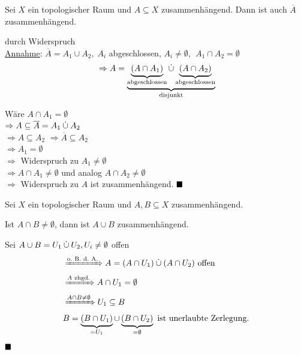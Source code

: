 \begin{bemerkung}\label{zusammenhangAbschluss}
    Sei $X$ ein topologischer Raum und $A \subseteq X$ zusammenhängend.
    Dann ist auch $\overline{A}$ zusammenhängend.
\end{bemerkung}

\begin{beweis} durch Widerspruch\\
    \underline{Annahme}: $\overline{A} = A_1 \cup A_2,\; A_i$ abgeschlossen, $A_i \neq \emptyset$,
    $\;A_1 \cap A_2 = \emptyset$
    \begin{align*}
        &\Rightarrow A = \underbrace{\underbrace{(A \cap A_1)}_\text{abgeschlossen} \mathbin{\dot{\cup}} \underbrace{(A \cap A_2)}_\text{abgeschlossen}}_\text{disjunkt}\\
    \end{align*}

    Wäre $A \cap A_1 = \emptyset$\\
    $\Rightarrow A \subseteq \overline{A} = A_1 \mathbin{\dot{\cup}} A_2$\\
    $\Rightarrow A \subseteq A_2$
    $\Rightarrow \overline{A} \subseteq A_2$\\
    $\Rightarrow A_1 = \emptyset$\\
    $\Rightarrow$ Widerspruch zu $A_1 \neq \emptyset$\\
    $\Rightarrow A \cap A_1 \neq \emptyset$ und analog 
                $A \cap A_2 \neq \emptyset$\\
    $\Rightarrow$ Widerspruch zu $A$ ist zusammenhängend. $ \qed$
\end{beweis}

\begin{bemerkung}\label{bem:zusammenhangVereinigung}
    Sei $X$ ein topologischer Raum und $A, B \subseteq X$ zusammenhängend.

    Ist $A \cap B \neq \emptyset$, dann ist $A \cup B$ zusammenhängend.
\end{bemerkung}

\begin{beweis}
    Sei $A \cup B = U_1 \mathbin{\dot{\cup}} U_2, U_i \neq \emptyset$ offen
    \begin{align*}
        &\xRightarrow{\text{o.~B.~d.~A.}} A = (A \cap U_1) \mathbin{\dot{\cup}} (A \cap U_2) \text{ offen}\\
        &\xRightarrow{A \text{ zhgd.}} A \cap U_1 = \emptyset\\
        &\xRightarrow{A \cap B \neq \emptyset} U_1 \subseteq B\\
        &B = \underbrace{(B \cap U_1)}_{= U_1} \cup \underbrace{(B \cap U_2)}_{= \emptyset} \text{ ist unerlaubte Zerlegung.}
    \end{align*}
    $\qed$
\end{beweis}

